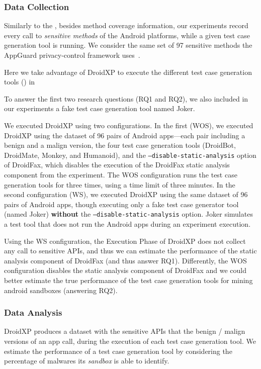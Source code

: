 \subsubsection{Data Collection}

Similarly to the \blls, besides
method coverage information, our experiments record every call
to \emph{sensitive methods} of the Android
platforms, while a given test case generation tool
is running. We consider the
same set of 97 sensitive methods 
the AppGuard privacy-control framework
uses~\cite{DBLP:conf/esorics/BackesGHMS13}.

Here we take advantage of
DroidXP to execute the different test case generation
tools () in

To answer the first two research questions
(RQ1 and RQ2), we also included in our experiments
a fake test case generation tool named
Joker.

We executed DroidXP using two
configurations. In the first (WOS), we executed DroidXP
using the dataset of 96 pairs of Android apps---each pair
including a benign and a malign version,
the four test case generation tools (DroidBot, DroidMate, Monkey, and Humanoid),
and the \texttt{--disable-static-analysis} option of
DroidFax, which disables the
execution of the DroidFax static analysis
component from the experiment. The WOS configuration
runs the test case generation tools for three times, using
a time limit of three minutes. 
In the second configuration (WS), we executed DroidXP
using the same dataset of 96 pairs of Android apps, though 
executing only a fake test case generator tool (named Joker)
{\bf without} the \texttt{--disable-static-analysis} option.
Joker simulates a test tool that does not
run the Android apps during an experiment execution.

Using the WS configuration, the Execution Phase of
DroidXP does not collect any call to 
sensitive APIs, and thus we can estimate the performance of the
static analysis component of DroidFax (and thus answer
RQ1).
Differently, the WOS configuration
disables the static analysis component of DroidFax and
we could better estimate the true performance of the test
case generation tools for mining android sandboxes 
(answering RQ2). 


\subsubsection{Data Analysis} 

DroidXP produces a
dataset with the sensitive
APIs that the benign / malign
versions of an app call, during
the execution of each test case
generation tool. We estimate the
performance of a test case generation
tool by considering the percentage of
malwares its \emph{sandbox} is able to
identify.

